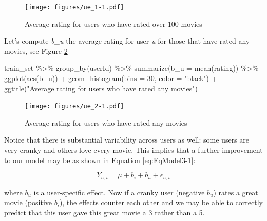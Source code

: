 \documentclass[
]{article}
\newenvironment{Shaded}{}{}
\newcommand{\AttributeTok}[1]{\textcolor[rgb]{0.49,0.56,0.16}{#1}}
\newcommand{\DecValTok}[1]{\textcolor[rgb]{0.25,0.63,0.44}{#1}}
\newcommand{\FunctionTok}[1]{\textcolor[rgb]{0.02,0.16,0.49}{#1}}
\newcommand{\NormalTok}[1]{#1}
\newcommand{\SpecialCharTok}[1]{\textcolor[rgb]{0.25,0.44,0.63}{#1}}
\newcommand{\StringTok}[1]{\textcolor[rgb]{0.25,0.44,0.63}{#1}}
\begin{document}
\begin{figure}
\centering
\texttt{[image: figures/ue\_1-1.pdf]}
\caption{Average rating for users who have rated over 100
movies\label{fig:average_ratings_for_users_who_have_rated_over_100_movies}}
\end{figure}

\newpage

Let's compute \emph{b\_u} the average rating for user \emph{u} for those
that have rated any movies, see Figure
\ref{fig:average_ratings_for_users_who_have_rated_any_movies}

\begin{Shaded}
\begin{Highlighting}[]
\NormalTok{train\_set }\SpecialCharTok{\%\textgreater{}\%} \FunctionTok{group\_by}\NormalTok{(userId) }\SpecialCharTok{\%\textgreater{}\%} \FunctionTok{summarize}\NormalTok{(}\AttributeTok{b\_u =} \FunctionTok{mean}\NormalTok{(rating)) }\SpecialCharTok{\%\textgreater{}\%} 
    \FunctionTok{ggplot}\NormalTok{(}\FunctionTok{aes}\NormalTok{(b\_u)) }\SpecialCharTok{+} \FunctionTok{geom\_histogram}\NormalTok{(}\AttributeTok{bins =} \DecValTok{30}\NormalTok{, }\AttributeTok{color =} \StringTok{"black"}\NormalTok{) }\SpecialCharTok{+} 
    \FunctionTok{ggtitle}\NormalTok{(}\StringTok{"Average rating for users who have rated any movies"}\NormalTok{)}
\end{Highlighting}
\end{Shaded}

\begin{figure}
\centering
\texttt{[image: figures/ue\_2-1.pdf]}
\caption{Average rating for users who have rated any
movies\label{fig:average_ratings_for_users_who_have_rated_any_movies}}
\end{figure}

Notice that there is substantial variability across users as well: some
users are very cranky and others love every movie. This implies that a
further improvement to our model may be as shown in Equation
\ref{eq:EqModel3-1}:

%
\par

\label{eq:EqModel3-1} \begin{equation}
  Y_{u,i} = \mu + b_{i} + b_{u} + \epsilon_{u,i}
\end{equation}

where \(b_{u}\) is a user-specific effect. Now if a cranky user
(negative \(b_{u}\)) rates a great movie (positive \(b_{i}\)), the
effects counter each other and we may be able to correctly predict that
this user gave this great movie a 3 rather than a 5.
\end{document}
